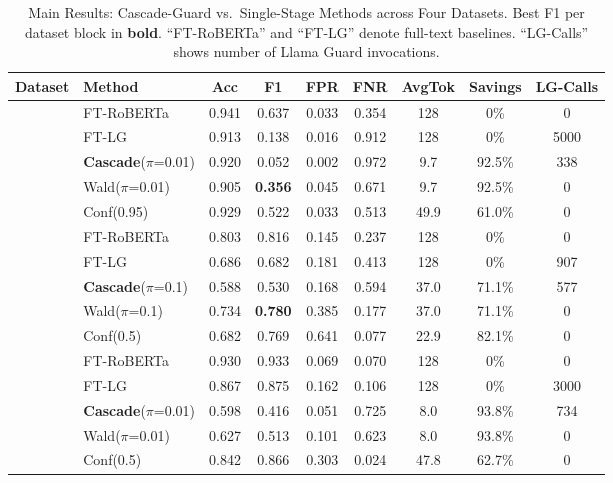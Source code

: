 \documentclass[acmtjournal, acmnowidth]{acmart}
\theoremstyle{definition}
\begin{document}
\begin{table}[h]
\caption{Main Results: Cascade-Guard vs.\ Single-Stage Methods across Four Datasets. Best F1 per dataset block in \textbf{bold}. ``FT-RoBERTa'' and ``FT-LG'' denote full-text baselines. ``LG-Calls'' shows number of Llama Guard invocations.}
\label{tab:main_results}
\small
\begin{tabular}{llccccccc}
\toprule
Dataset & Method & Acc & F1 & FPR & FNR & AvgTok & Savings & LG-Calls \\
\midrule
{}
 & FT-RoBERTa & 0.941 & 0.637 & 0.033 & 0.354 & 128 & 0\% & 0 \\
 & FT-LG & 0.913 & 0.138 & 0.016 & 0.912 & 128 & 0\% & 5000 \\
 & \textbf{Cascade}($\pi$=0.01) & 0.920 & 0.052 & 0.002 & 0.972 & 9.7 & 92.5\% & 338 \\
 & Wald($\pi$=0.01) & 0.905 & \textbf{0.356} & 0.045 & 0.671 & 9.7 & 92.5\% & 0 \\
 & Conf(0.95) & 0.929 & 0.522 & 0.033 & 0.513 & 49.9 & 61.0\% & 0 \\
\midrule
{}
 & FT-RoBERTa & 0.803 & 0.816 & 0.145 & 0.237 & 128 & 0\% & 0 \\
 & FT-LG & 0.686 & 0.682 & 0.181 & 0.413 & 128 & 0\% & 907 \\
 & \textbf{Cascade}($\pi$=0.1) & 0.588 & 0.530 & 0.168 & 0.594 & 37.0 & 71.1\% & 577 \\
 & Wald($\pi$=0.1) & 0.734 & \textbf{0.780} & 0.385 & 0.177 & 37.0 & 71.1\% & 0 \\
 & Conf(0.5) & 0.682 & 0.769 & 0.641 & 0.077 & 22.9 & 82.1\% & 0 \\
\midrule
{}
 & FT-RoBERTa & 0.930 & 0.933 & 0.069 & 0.070 & 128 & 0\% & 0 \\
 & FT-LG & 0.867 & 0.875 & 0.162 & 0.106 & 128 & 0\% & 3000 \\
 & \textbf{Cascade}($\pi$=0.01) & 0.598 & 0.416 & 0.051 & 0.725 & 8.0 & 93.8\% & 734 \\
 & Wald($\pi$=0.01) & 0.627 & 0.513 & 0.101 & 0.623 & 8.0 & 93.8\% & 0 \\
 & Conf(0.5) & 0.842 & 0.866 & 0.303 & 0.024 & 47.8 & 62.7\% & 0 \\

\end{tabular}
\end{table}
\end{document}
